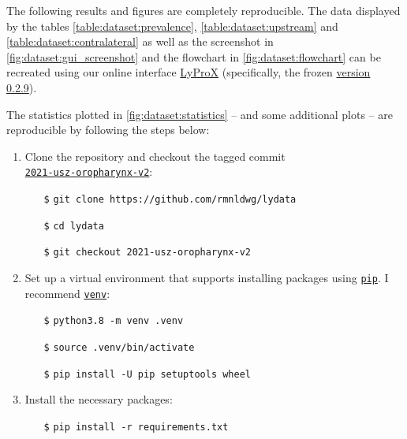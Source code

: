 \begin{tcolorbox}[title=\faIcon{recycle} Reproducibility, parbox=false]
    The following results and figures are completely reproducible. The data displayed by the tables \cref{table:dataset:prevalence}, \cref{table:dataset:upstream} and \cref{table:dataset:contralateral} as well as the screenshot in \cref{fig:dataset:gui_screenshot} and the flowchart in \cref{fig:dataset:flowchart} can be recreated using our online interface \href{https://lyprox.org}{ LyProX} (specifically, the frozen \href{https://2021-oropharynx.lyprox.org}{ version 0.2.9}).
    
    The statistics plotted in \cref{fig:dataset:statistics} -- and some additional plots -- are reproducible by following the steps below:

    \begin{enumerate}
        \item Clone the  repository and checkout the tagged commit \\
        \href{https://github.com/rmnldwg/lydata/tree/2021-usz-oropharynx-v2}{ \texttt{2021-usz-oropharynx-v2}}:
        \begin{itemize}[leftmargin=10mm]
            \setlength\itemsep{-0.5em}
            \item[\texttt{\$}] \verb|git clone https://github.com/rmnldwg/lydata|
            \item[\texttt{\$}] \verb|cd lydata|
            \item[\texttt{\$}] \verb|git checkout 2021-usz-oropharynx-v2|
        \end{itemize}

        \item Set up a virtual environment that supports installing packages using \href{https://pypi.org/project/pip/}{\texttt{pip}}. I recommend \href{https://docs.python.org/3/library/venv.html}{\texttt{venv}}:
        \begin{itemize}[leftmargin=10mm]
            \setlength\itemsep{-0.5em}
            \item[\texttt{\$}] \verb|python3.8 -m venv .venv|
            \item[\texttt{\$}] \verb|source .venv/bin/activate|
            \item[\texttt{\$}] \verb|pip install -U pip setuptools wheel|
        \end{itemize}

        \item Install the necessary packages:
        \begin{itemize}[leftmargin=10mm]
            \setlength\itemsep{-0.5em}
            \item[\texttt{\$}] \verb|pip install -r requirements.txt|
        \end{itemize}


\end{enumerate}
\end{tcolorbox}

